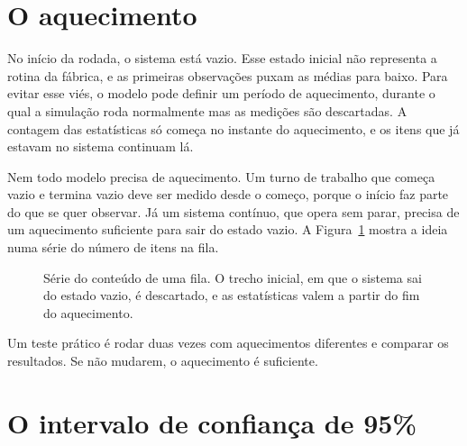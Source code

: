 \section{O aquecimento}

No início da rodada, o sistema está vazio. Esse estado inicial não representa a rotina da fábrica, e as primeiras observações puxam as médias para baixo. Para evitar esse viés, o modelo pode definir um período de aquecimento, durante o qual a simulação roda normalmente mas as medições são descartadas. A contagem das estatísticas só começa no instante do aquecimento, e os itens que já estavam no sistema continuam lá.

Nem todo modelo precisa de aquecimento. Um turno de trabalho que começa vazio e termina vazio deve ser medido desde o começo, porque o início faz parte do que se quer observar. Já um sistema contínuo, que opera sem parar, precisa de um aquecimento suficiente para sair do estado vazio. A Figura~\ref{fig-aquecimento} mostra a ideia numa série do número de itens na fila.

\begin{figure}[ht]
\centering
{}
\caption{Série do conteúdo de uma fila. O trecho inicial, em que o sistema sai do estado vazio, é descartado, e as estatísticas valem a partir do fim do aquecimento.}
\label{fig-aquecimento}
\end{figure}

Um teste prático é rodar duas vezes com aquecimentos diferentes e comparar os resultados. Se não mudarem, o aquecimento é suficiente.

\section{O intervalo de confiança de 95\%}

